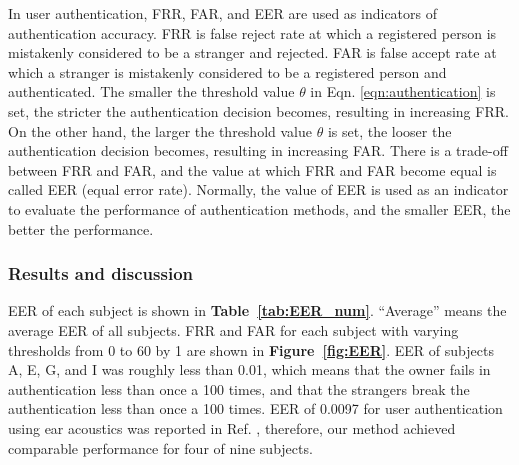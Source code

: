 \documentclass[sigchi,authordraft]{acmart}
\newcommand\figref[1]{\textbf{Figure~\ref{fig:#1}}}
\newcommand\tabref[1]{\textbf{Table~\ref{tab:#1}}}
\begin{document}
In user authentication, FRR, FAR, and EER are used as indicators of authentication accuracy. FRR is false reject rate at which a registered person is mistakenly considered to be a stranger and rejected. FAR is false accept rate at which a stranger is mistakenly considered to be a registered person and authenticated. The smaller the threshold value $\theta$ in Eqn. \ref{eqn:authentication} is set, the stricter the authentication decision becomes, resulting in increasing FRR. On the other hand, the larger the threshold value $\theta$ is set, the looser the authentication decision becomes, resulting in increasing FAR. 
There is a trade-off between FRR and FAR, and the value at which FRR and FAR become equal is called EER (equal error rate). Normally, the value of EER is used as an indicator to evaluate the performance of authentication methods, and the smaller EER, the better the performance.


\subsubsection{Results and discussion}
EER of each subject is shown in \tabref{EER_num}. ``Average'' means the average EER of all subjects. FRR and FAR for each subject with varying thresholds from 0 to 60 by 1 are shown in \figref{EER}. EER of subjects A, E, G, and I was roughly less than 0.01, which means that the owner fails in authentication less than once a 100 times, and that the strangers break the authentication less than once a 100 times. EER of 0.0097 for user authentication using ear acoustics was reported in Ref. \cite{ear_auth}, therefore, our method achieved comparable performance for four of nine subjects. 

\end{document}
